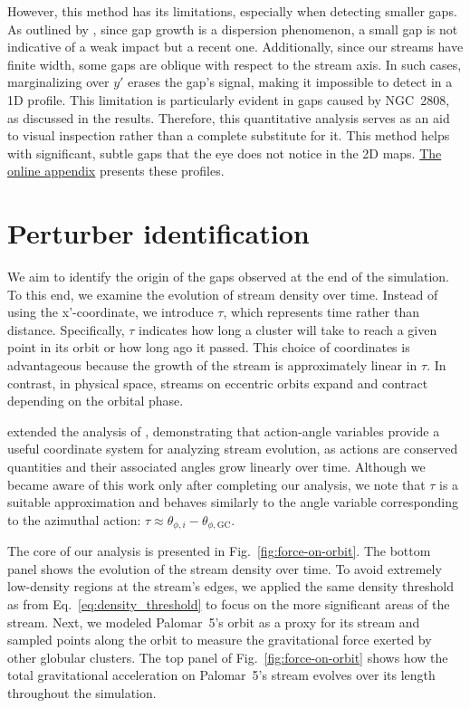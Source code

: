 \documentclass{aa}
\begin{document}
\begin{appendix}
    However, this method has its limitations, especially when detecting smaller gaps. As outlined by \citet{2015MNRAS.450.1136E}, since gap growth is a dispersion phenomenon, a small gap is not indicative of a weak impact but a recent one. Additionally, since our streams have finite width, some gaps are oblique with respect to the stream axis. In such cases, marginalizing over $y'$ erases the gap's signal, making it impossible to detect in a 1D profile. This limitation is particularly evident in gaps caused by NGC~2808, as discussed in the results. Therefore, this quantitative analysis serves as an aid to visual inspection rather than a complete substitute for it. This method helps with significant, subtle gaps that the eye does not notice in the 2D maps. \href{https://zenodo.org/records/15528089}{The online appendix} presents these profiles.


  \section{Perturber identification} \label{sec:Perturber_Identification}

   We aim to identify the origin of the gaps observed at the end of the simulation. To this end, we examine the evolution of stream density over time. Instead of using the x'-coordinate, we introduce $\tau$, which represents time rather than distance. Specifically, $\tau$ indicates how long a cluster will take to reach a given point in its orbit or how long ago it passed. This choice of coordinates is advantageous because the growth of the stream is approximately linear in $\tau$. In contrast, in physical space, streams on eccentric orbits expand and contract depending on the orbital phase.


    \citet{2016MNRAS.457.3817S} extended the analysis of \citet{2015MNRAS.450.1136E}, demonstrating that action-angle variables provide a useful coordinate system for analyzing stream evolution, as actions are conserved quantities and their associated angles grow linearly over time. Although we became aware of this work only after completing our analysis, we note that $\tau$ is a suitable approximation and behaves similarly to the angle variable corresponding to the azimuthal action: $\tau \approx \theta_{\phi, i} - \theta_{\phi,\text{GC}}$.

    The core of our analysis is presented in Fig.~\ref{fig:force-on-orbit}. The bottom panel shows the evolution of the stream density over time. To avoid extremely low-density regions at the stream's edges, we applied the same density threshold as from Eq.~\ref{eq:density_threshold} to focus on the more significant areas of the stream. Next, we modeled Palomar~5's orbit as a proxy for its stream and sampled points along the orbit to measure the gravitational force exerted by other globular clusters. The top panel of Fig.~\ref{fig:force-on-orbit} shows how the total gravitational acceleration on Palomar~5's stream evolves over its length throughout the simulation.


\end{appendix}
\end{document}
